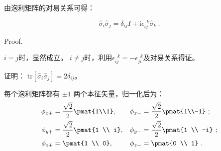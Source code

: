 由泡利矩阵的对易关系可得：
\begin{theorem}{}
\begin{equation}\label{eq_pauliM_1}
\hat{\sigma}_i\hat{\sigma}_j = \delta_{ij}I + \mathrm{i}\epsilon ^{\,\,\, k}_{ij}\hat{\sigma}_k~.
\end{equation}
\end{theorem}
Proof.

$i=j$时，显然成立。
$i\neq j$时，利用$\epsilon ^{\,\,\, k}_{ij}=-\epsilon ^{\,\,\, k}_{ji}$及对易关系得证。


\begin{exercise}{}
证明：
$\mathrm{tr}[\hat{\sigma}_i \hat{\sigma}_j]= 2\delta_{ij}$。
\end{exercise}

每个泡利矩阵都有 $\pm 1$ 两个本征矢量，归一化后为：
\begin{equation}
\begin{aligned}
\phi_{x+} &= \frac{\sqrt 2}{2}\pmat{1\\1}, &\phi_{x-} &= \frac{\sqrt 2}{2} \pmat{1\\-1}~;\\
\phi_{y+} &= \frac{\sqrt 2}{2}\pmat{1 \\ i}, &\phi_{y-} &= \frac{\sqrt 2}{2} \pmat{1 \\ -i} ~;\\
\phi_{z+} &= \pmat{1 \\ 0}, &\phi_{z-} &= \pmat{0 \\ 1}~.
\end{aligned}
\end{equation}


%